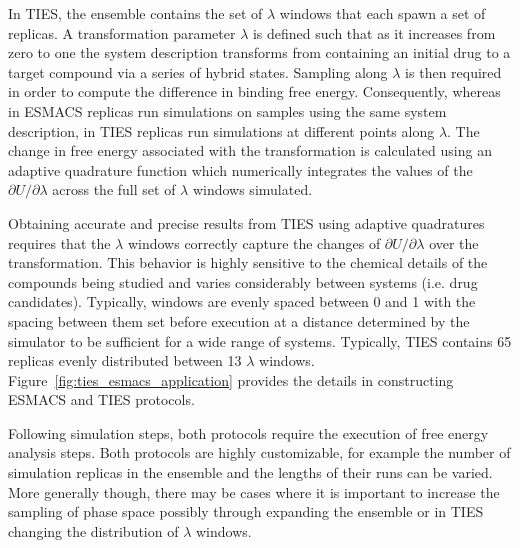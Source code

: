 In TIES, the ensemble contains the set of \textbf{$\lambda$} windows that each 
spawn a set of replicas. A transformation parameter $\lambda$ is defined such 
that as it increases from zero to one the system description transforms from 
containing an initial drug to a target compound via a series of hybrid states. 
Sampling along $\lambda$ is then required in order to compute the difference in 
binding free energy. Consequently, whereas in ESMACS replicas run simulations on 
samples using the same system description, in TIES replicas run simulations at 
different points along $\lambda$. The change in free energy associated with the 
transformation is calculated using an adaptive quadrature function which
numerically integrates the values of the $\partial U/\partial\lambda$ across the 
full set of $\lambda$ windows simulated. 

Obtaining accurate and precise results from TIES using adaptive quadratures 
requires that the $\lambda$ windows correctly capture the changes of 
$\partial U/\partial\lambda$ over the transformation. This behavior is highly 
sensitive to the chemical details of the compounds being studied and varies 
considerably between systems (i.e. drug candidates). Typically, windows are 
evenly spaced between 0 and 1 with the spacing between them set before execution 
at a distance determined by the simulator to be sufficient for a wide range of 
systems. Typically, TIES contains 65 replicas evenly distributed between 13 
$\lambda$ windows. Figure~\ref{fig:ties_esmacs_application} provides the details 
in constructing ESMACS and TIES protocols. 


Following simulation steps, both protocols require the execution of free energy 
analysis steps. Both protocols are highly customizable, for example the number 
of simulation replicas in the ensemble and the lengths of their runs can be 
varied. More generally though, there may be cases where it is important to 
increase the sampling of phase space possibly through expanding the ensemble 
or in TIES changing the distribution of $\lambda$ windows.



